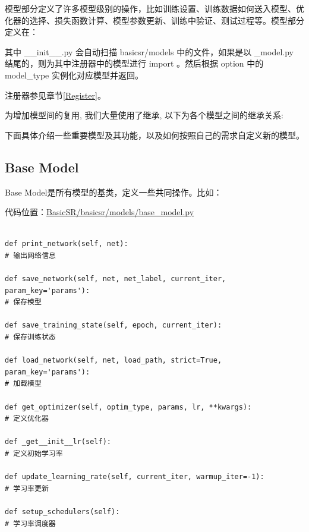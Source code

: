 \documentclass[../main.tex]{subfiles}
\begin{document}
模型部分定义了许多模型级别的操作，比如训练设置、训练数据如何送入模型、优化器的选择、损失函数计算、模型参数更新、训练中验证、测试过程等。模型部分定义在：

其中 \_\_init\_\_.py 会自动扫描 basicsr/models 中的文件，如果是以 \_model.py 结尾的，则为其中注册器中的模型进行 import 。然后根据 option 中的 model\_type 实例化对应模型并返回。

\begin{note} %
    注册器参见章节\ref{Register}。
\end{note}

为增加模型间的复用, 我们大量使用了继承, 以下为各个模型之间的继承关系:


下面具体介绍一些重要模型及其功能，以及如何按照自己的需求自定义新的模型。

\subsection{Base Model}
Base Model是所有模型的基类，定义一些共同操作。比如：

代码位置：\href{https://github.com/XPixelGroup/BasicSR/blob/master/basicsr/models/base_model.py}{BasicSR/basicsr/models/base\_model.py}
\begin{verbatim}

def print_network(self, net):
# 输出网络信息

def save_network(self, net, net_label, current_iter, param_key='params'):
# 保存模型

def save_training_state(self, epoch, current_iter):
# 保存训练状态

def load_network(self, net, load_path, strict=True, param_key='params'):
# 加载模型

def get_optimizer(self, optim_type, params, lr, **kwargs):
# 定义优化器

def _get__init__lr(self):
# 定义初始学习率

def update_learning_rate(self, current_iter, warmup_iter=-1):
# 学习率更新

def setup_schedulers(self):
# 学习率调度器
\end{verbatim}
\end{document}
